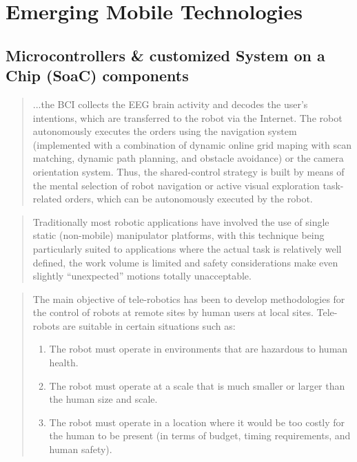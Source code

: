 \documentclass[a4paper,12pt]{report}
\begin{document}
\section{Emerging Mobile Technologies}

\subsection{Microcontrollers \& customized System on a Chip (SoaC) components}

\begin{quotation}{
	...the BCI collects the EEG brain activity and decodes the user's intentions, which are transferred to the robot via the Internet. The robot autonomously executes the orders using the navigation system (implemented with a combination of dynamic online grid maping with scan matching, dynamic path planning, and obstacle avoidance) or the camera orientation system. Thus, the shared-control strategy is built by means  of the mental selection of robot navigation or active visual exploration task-related orders, which can be autonomously executed by the robot.}
	\begin{flushright}
		\cite{6104414}
	\end{flushright}
\end{quotation}
\begin{quote}
	Traditionally most robotic applications have involved the use of single static (non-mobile) manipulator platforms, with this technique being particularly suited to applications where the actual task is relatively well defined, the work volume is limited and safety considerations make even slightly “unexpected” motions totally unacceptable.
	\begin{flushright}
		\cite{540147}
	\end{flushright}
\end{quote}
\begin{quote}

The main objective of tele-robotics has been to develop methodologies for the control of robots at remote sites by human users at local sites. Tele-robots are suitable in certain situations such as:
\begin{enumerate}
\item The robot must operate in environments that are hazardous to human health.
\item The robot must operate at a scale that is much smaller or larger than the human size and scale.
\item The robot must operate in a location where it would be too costly for the human to be present (in terms of budget, timing requirements, and human safety).
\end{enumerate}
	\begin{flushright}
		\cite{726589}
	\end{flushright}
\end{quote}
\end{document}
